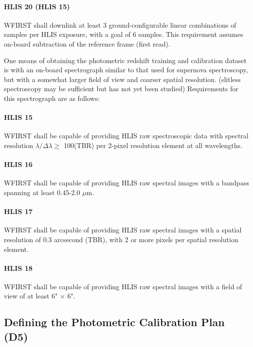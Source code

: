 \paragraph{HLIS 20 (HLIS 15)} WFIRST shall downlink at least 3 ground-configurable linear
combinations of samples per HLIS exposure, with a goal of 6 samples. This
requirement assumes on-board subtraction of the reference frame (first read).

One means of obtaining the photometric redshift training and calibration dataset
is with an on-board spectrograph similar to that used for supernova
spectroscopy, but with a somewhat larger field of view and coarser spatial
resolution. (slitless spectroscopy may be sufficient but has not yet been
studied) Requirements for this spectrograph are as follows:

\paragraph{HLIS 15} WFIRST shall be capable of providing HLIS raw spectroscopic data with spectral
resolution $\lambda /\Delta \lambda \geq$ 100(TBR) per 2-pixel resolution element at all wavelengths.

\paragraph{HLIS 16} WFIRST shall be capable of providing HLIS raw spectral images with a
bandpass spanning at least 0.45-2.0 $\mu$m.

\paragraph{HLIS 17} WFIRST shall be capable of providing HLIS raw spectral
images with a spatial resolution of 0.3 arcsecond (TBR), with 2 or more pixels
per spatial resolution element.

\paragraph{HLIS 18} WFIRST shall be capable of providing HLIS raw spectral
images with a field of view of at least 6" $\times$ 6".


\subsection{Defining the Photometric Calibration Plan (D5)}
\label{sec:wl_calibration}

